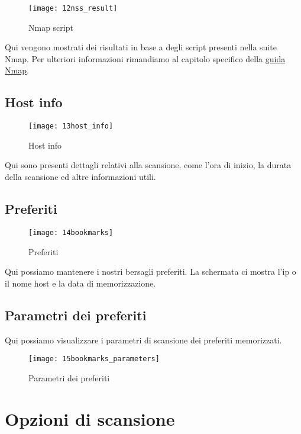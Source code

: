 \begin{figure}[h]
  \centering
  \texttt{[image: 12nss\_result]}
  \caption{Nmap script}
  \label{fig:NmapScript}
\end{figure}
Qui vengono mostrati dei risultati in base a degli script presenti nella suite 
Nmap. Per ulteriori informazioni rimandiamo al capitolo specifico della 
\href{http://nmap.org/book/nse.html}{guida Nmap}.

\subsection{Host info}
\label{sec:HostInfo}

\begin{figure}[h]
  \centering
  \texttt{[image: 13host\_info]}
  \caption{Host info}
  \label{fig:HostInfo}
\end{figure}
Qui sono presenti dettagli relativi alla scansione, come l'ora di inizio, la 
durata della scansione ed altre informazioni utili.

\subsection{Preferiti}
\label{sec:Bookmarks}

\begin{figure}[h]
  \centering
  \texttt{[image: 14bookmarks]}
  \caption{Preferiti}
  \label{fig:Bookmarks}
\end{figure}
Qui possiamo mantenere i nostri bersagli preferiti. La schermata ci mostra l'ip 
o il nome host e la data di memorizzazione.

\subsection{Parametri dei preferiti}
\label{sec:BookmarksParameters}

Qui possiamo visualizzare i parametri di scansione dei preferiti memorizzati.
\begin{figure}[h]
  \centering
  \texttt{[image: 15bookmarks\_parameters]}
  \caption{Parametri dei preferiti}
  \label{fig:BookmarksParameters}
\end{figure}


\section{Opzioni di scansione}
\label{sec:ScanOptions}

